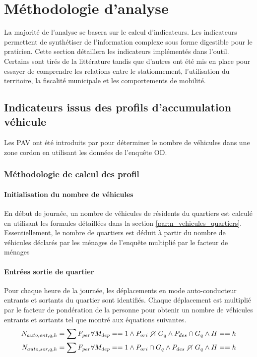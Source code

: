 \section{Méthodologie d'analyse} \label{sec:meth_analyse}
    La majorité de l'analyse se basera sur le calcul d'indicateurs. Les indicateurs permettent de synthétiser de l'information complexe sous forme digestible pour le praticien. Cette section détaillera les indicateurs implémentés dans l'outil. Certains sont tirés de la littérature tandis que d'autres ont été mis en place pour essayer de comprendre les relations entre le stationnement, l'utilisation du territoire, la fiscalité municipale et les comportements de mobilité.
    \subsection{Indicateurs issus des profils d'accumulation véhicule}
    Les \ac{PAV} ont été introduits par \textcite{morency_characterizing_2008} pour déterminer le nombre de véhicules dans une zone cordon en utilisant les données de l'enquête OD. 
    \subsubsection{Méthodologie de calcul des profil}
    \paragraph{Initialisation du nombre de véhicules} En début de journée, un nombre de véhicules de résidents du quartiers est calculé en utilisant les formules détaillées dans la section \ref{par:n_vehicules_quartiers}. Essentiellement, le nombre de quartiers est déduit à partir du nombre de véhicules déclarés par les ménages de l'enquête multiplié par le facteur de ménages
    \paragraph{Entrées sortie de quartier} Pour chaque heure de la journée, les déplacements en mode auto-conducteur entrants et sortants du quartier sont identifiés. Chaque déplacement est multiplié par le facteur de pondération de la personne pour obtenir un nombre de véhicules entrants et sortants tel que montré aux équations suivantes.
    \begin{align}
        N_{auto,ent,q,h} &= \sum{F_{per}}\forall M_{dep} == 1 \wedge P_{ori} \disjoint G_q \wedge P_{des} \cap G_q \wedge H==h\\
        N_{auto,sor,q,h} &= \sum{F_{per}} \forall M_{dep} == 1 \wedge P_{ori} \cap G_q \wedge P_{des} \disjoint G_q \wedge H==h
    \end{align}
